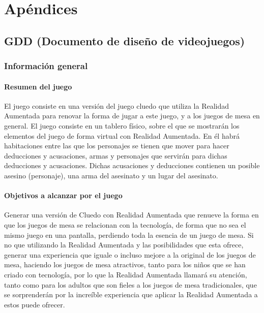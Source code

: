 \chapter{Apéndices}
\label{ch:apendices}


\section{GDD (Documento de diseño de videojuegos)}

\subsection{Información general}

\subsubsection{Resumen del juego}
El juego consiste en una versión del juego cluedo que utiliza la Realidad Aumentada para renovar la forma de jugar a este juego, y a los juegos de mesa en general. El juego consiste en un tablero físico, sobre el que se mostrarán los elementos del juego de forma virtual con Realidad Aumentada. En él habrá habitaciones entre las que los personajes se tienen que mover para hacer deducciones y acusaciones, armas y personajes que servirán para dichas deducciones y acusaciones. Dichas acusaciones y deducciones contienen un posible asesino (personaje), una arma del asesinato y un lugar del asesinato.

\subsubsection{Objetivos a alcanzar por el juego}
Generar una versión de Cluedo con Realidad Aumentada que renueve la forma en que los juegos de mesa se relacionan con la tecnología, de forma que no sea el mismo juego en una pantalla, perdiendo toda la esencia de un juego de mesa. Si no que utilizando la Realidad Aumentada y las posibilidades que esta ofrece, generar una experiencia que iguale o incluso mejore a la original de los juegos de mesa, haciendo los juegos de mesa atractivos, tanto para los niños que se han criado con tecnología, por lo que la Realidad Aumentada llamará su atención, tanto como para los adultos que son fieles a los juegos de mesa tradicionales, que se sorprenderán por la increíble experiencia que aplicar la Realidad Aumentada a estos puede ofrecer.

